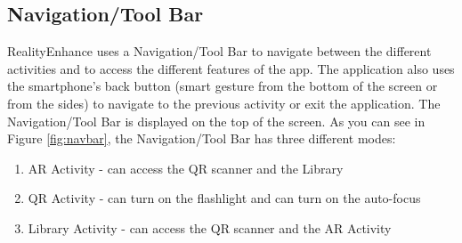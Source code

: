 \subsection{Navigation/Tool Bar}
RealityEnhance uses a Navigation/Tool Bar to navigate between the different activities and to access the different features of the app. The application also uses the smartphone's back button (smart gesture from the bottom of the screen or from the sides) to navigate to the previous activity or exit the application. The Navigation/Tool Bar is displayed on the top of the screen. As you can see in Figure \ref{fig:navbar}, the Navigation/Tool Bar has three different modes:

\renewcommand{\labelenumi}{(\alph{enumi})}
\begin{enumerate}
    \item AR Activity  - can access the QR scanner and the Library
    \item QR Activity - can turn on the flashlight and can turn on the auto-focus
    \item Library Activity - can access the QR scanner and the AR Activity
\end{enumerate}


